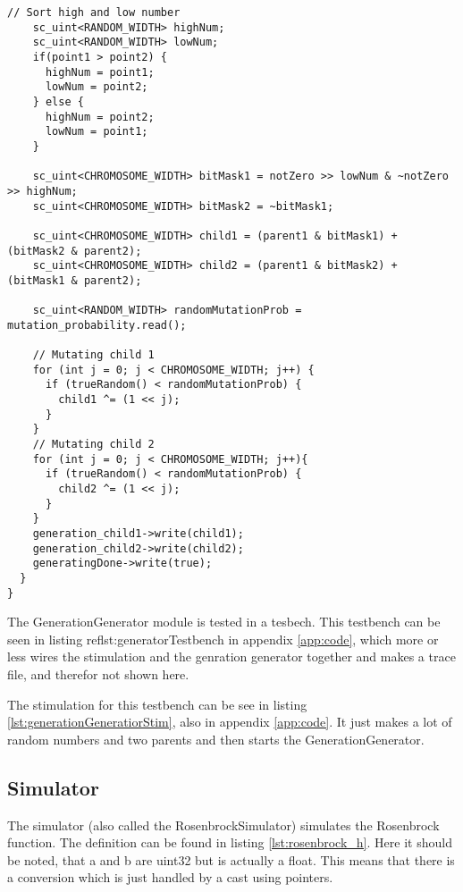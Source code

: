 \begin{lstlisting}[style=customc++,caption={GenerationGenerator.cpp},label={lst:generationgenerator_cpp}]
    // Sort high and low number
    sc_uint<RANDOM_WIDTH> highNum;
    sc_uint<RANDOM_WIDTH> lowNum;
    if(point1 > point2) {
      highNum = point1;
      lowNum = point2;
    } else {
      highNum = point2;
      lowNum = point1;
    }
  
    sc_uint<CHROMOSOME_WIDTH> bitMask1 = notZero >> lowNum & ~notZero >> highNum;
    sc_uint<CHROMOSOME_WIDTH> bitMask2 = ~bitMask1;

    sc_uint<CHROMOSOME_WIDTH> child1 = (parent1 & bitMask1) + (bitMask2 & parent2);
    sc_uint<CHROMOSOME_WIDTH> child2 = (parent1 & bitMask2) + (bitMask1 & parent2);

    sc_uint<RANDOM_WIDTH> randomMutationProb = mutation_probability.read();

    // Mutating child 1
    for (int j = 0; j < CHROMOSOME_WIDTH; j++) {
      if (trueRandom() < randomMutationProb) {
        child1 ^= (1 << j);
      }
    }
    // Mutating child 2
    for (int j = 0; j < CHROMOSOME_WIDTH; j++){
      if (trueRandom() < randomMutationProb) {
        child2 ^= (1 << j);
      }
    }
    generation_child1->write(child1);
    generation_child2->write(child2);
    generatingDone->write(true);
  }
}
\end{lstlisting}

The GenerationGenerator module is tested in a tesbech. This testbench can be seen in listing ref{lst:generatorTestbench} in appendix \ref{app:code}, which more or less wires the stimulation and the genration generator together and makes a trace file, and therefor not shown here.

The stimulation for this testbench can be see in listing \ref{lst:generationGeneratiorStim}, also in appendix \ref{app:code}. It just makes a lot of random numbers and two parents and then starts the GenerationGenerator.

\subsection{Simulator}
The simulator (also called the RosenbrockSimulator) simulates the Rosenbrock function. The definition can be found in listing \ref{lst:rosenbrock_h}. Here it should be noted, that a and b are uint32 but is actually a float. This means that there is a conversion which is just handled by a cast using pointers.

